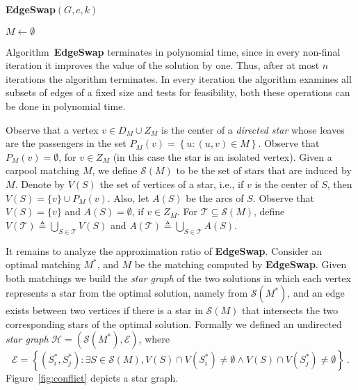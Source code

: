 \documentclass[11pt]{article}
\newcommand{\set}[1]{\left\{ #1 \right\}}
\newcommand{\eqdf}{\triangleq}
\def\N{\mathbb{N}}
\newcommand{\calS}{\mathcal{S}}
\newcommand{\calT}{\mathcal{T}}
\newcommand{\calH}{\mathcal{H}}
\newcommand{\calE}{\mathcal{E}}
\begin{document}
\begin{algorithm}
\caption{\textbf{EdgeSwap}$(G,c,k)$}
\label{alg:local}
$M \leftarrow \emptyset$								\\
\end{algorithm}

Algorithm~\textbf{EdgeSwap} terminates in polynomial time, since in
every non-final iteration it improves the value of the solution by
one.  Thus, after at most $n$ iterations the algorithm terminates.  In
every iteration the algorithm examines all subsets of edges of a fixed
size and tests for feasibility, both these operations can be done in
polynomial time.

Observe that a vertex $v \in D_M \cup Z_M$ is the center of a
\emph{directed star} whose leaves are the passengers in the set
$P_M(v) = \set{u : (u,v) \in M}$.  Observe that $P_M(v) = \emptyset$,
for $v \in Z_M$ (in this case the star is an isolated vertex).
%
Given a carpool matching $M$, we define $\calS(M)$ to be the set of
stars that are induced by $M$.
%
Denote by $V(S)$ the set of vertices of a star, i.e., if $v$ is the
center of $S$, then $V(S) = \{v\} \cup P_M(v)$.  
Also, let $A(S)$ be
the arcs of $S$.
%
Observe that $V(S) = \{v\}$ and $A(S) = \emptyset$, if $v \in Z_M$.
%
For $\calT \subseteq \calS(M)$, define $V(\calT) \eqdf \bigcup_{S \in
  \calT} V(S)$ and $A(\calT) \eqdf \bigcup_{S \in \calT} A(S)$.

It remains to analyze the approximation ratio of \textbf{EdgeSwap}.
Consider an optimal matching $M^*$, and $M$ be the matching computed
by \textbf{EdgeSwap}.  Given both matchings we build the \emph{star
  graph} of the two solutions in which each vertex represents a star
from the optimal solution, namely from $\calS(M^*)$, and an edge
exists between two vertices if there is a star in $\calS(M)$ that
intersects the two corresponding stars of the optimal solution.
%
Formally we defined an undirected \emph{star graph} $\calH =
(\calS(M^*), \calE)$, where
\[
\calE = \set{(S^*_i, S^*_j) : \exists S \in \calS(M), 
             V(S) \cap V(S^*_i) \neq \emptyset \land
             V(S) \cap V(S^*_j) \neq \emptyset}
~.
\]
Figure~\ref{fig:conflict} depicts a star graph.
\end{document}
